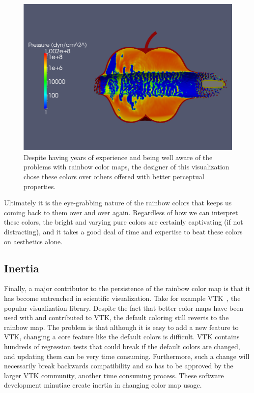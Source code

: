\documentclass[letterpaper,twocolumn,fleqn]{article}
\newcommand*{\lcite}[1]{~\cite{#1}}
\begin{document}
\begin{figure}[htb]
  \centering
  \includegraphics[width=\linewidth]{images/pres-log-legend-0042}
  \caption{Despite having years of experience and being well aware of the
    problems with rainbow color maps, the designer of this visualization
    chose these colors over others offered with better perceptual
    properties.}
  \label{fig:ExpertRainbowVis}
\end{figure}

Ultimately it is the eye-grabbing nature of the rainbow colors that keeps
us coming back to them over and over again. Regardless of how we can
interpret these colors, the bright and varying pure colors are certainly
captivating (if not distracting), and it takes a good deal of time and
expertise to beat these colors on aesthetics alone.

\subsection{Inertia}

\noindent
Finally, a major contributor to the persistence of the rainbow color map is
that it has become entrenched in scientific visualization. Take for example
VTK\lcite{VTK}, the popular visualization library. Despite the fact that
better color maps have been used with and contributed to VTK, the default
coloring still reverts to the rainbow map. The problem is that although it
is easy to add a new feature to VTK, changing a core feature like the
default colors is difficult. VTK contains hundreds of regression tests that
could break if the default colors are changed, and updating them can be
very time consuming. Furthermore, such a change will necessarily break
backwards compatibility and so has to be approved by the larger VTK
community, another time consuming process. These software development
minutiae create inertia in changing color map usage.
\end{document}
